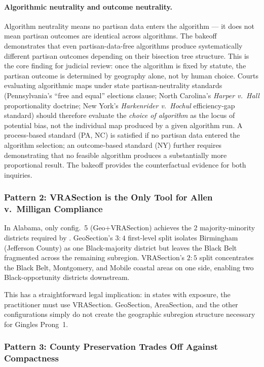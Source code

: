 \paragraph{Algorithmic neutrality and outcome neutrality.}
Algorithm neutrality means no partisan data enters the algorithm --- it does not
mean partisan outcomes are identical across algorithms.
The bakeoff demonstrates that even partisan-data-free algorithms produce
systematically different partisan outcomes depending on their bisection tree
structure.
This is the core finding for judicial review: once the algorithm is fixed by
statute, the partisan outcome is determined by geography alone, not by human
choice.
Courts evaluating algorithmic maps under state partisan-neutrality standards
(Pennsylvania's ``free and equal'' elections clause; North Carolina's
\textit{Harper v.\ Hall} proportionality doctrine; New York's
\textit{Harkenrider v.\ Hochul} efficiency-gap standard) should therefore
evaluate the \emph{choice of algorithm} as the locus of potential bias, not
the individual map produced by a given algorithm run.
A process-based standard (PA, NC) is satisfied if no partisan data entered
the algorithm selection; an outcome-based standard (NY) further requires
demonstrating that no feasible algorithm produces a substantially more
proportional result.
The bakeoff provides the counterfactual evidence for both inquiries.

\subsubsection*{Pattern 2: VRASection is the Only Tool for Allen v.\ Milligan Compliance}

In Alabama, only config.~5 (Geo+VRASection) achieves the 2 majority-minority
districts required by \allenmilligan{}.
GeoSection's $3:4$ first-level split isolates Birmingham (Jefferson County)
as one Black-majority district but leaves the Black Belt fragmented across the
remaining subregion.
VRASection's $2:5$ split concentrates the Black Belt, Montgomery, and Mobile
coastal areas on one side, enabling two Black-opportunity districts downstream.

This has a straightforward legal implication: in states with \allenmilligan{}
exposure, the practitioner must use VRASection.
GeoSection, AreaSection, and the other configurations simply do not create the
geographic subregion structure necessary for Gingles Prong~1.

\subsubsection*{Pattern 3: County Preservation Trades Off Against Compactness}

